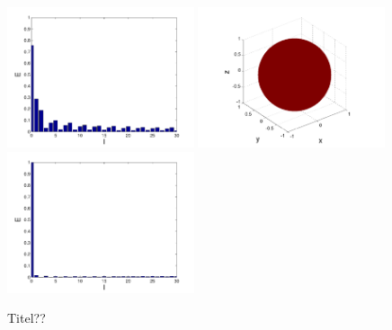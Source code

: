 \begin{refsection}
\begin{figure}
\includegraphics[width=0.49\textwidth]{kugel/Dkonstant/Kugel3_2.pdf}
\includegraphics[width=0.49\textwidth]{kugel/Dkonstant/Kugel4_1.pdf}
\includegraphics[width=0.49\textwidth]{kugel/Dkonstant/Kugel4_2.pdf}
\caption{Titel??
\label{skript:Dirac1}}
\end{figure}


\end{refsection}
